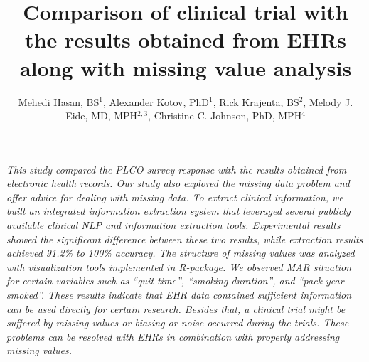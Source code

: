 \documentclass{amia}
\begin{document}
\title{Comparison of clinical trial with the results obtained from EHRs along with missing value analysis}

\author{Mehedi Hasan, BS$^{1}$, Alexander Kotov, PhD$^{1}$, Rick Krajenta, BS$^{2}$, Melody J. Eide, MD, MPH$^{2,3}$, Christine C. Johnson, PhD, MPH$^{4}$}


\maketitle

\textit{This study compared the PLCO survey response with the results obtained from electronic health records. Our study also explored the missing data problem and offer advice for dealing with missing data. To extract clinical information, we built an integrated information extraction system that leveraged several publicly available clinical NLP and information extraction tools. Experimental results showed the significant difference between these two results, while extraction results achieved 91.2\% to 100\% accuracy. The structure of missing values was analyzed with visualization tools implemented in R-package. We observed MAR situation for certain variables such as ``quit time'', ``smoking duration'', and ``pack-year smoked''. These results indicate that EHR data contained sufficient information can be used directly for certain research. Besides that, a clinical trial might be suffered by missing values or biasing or noise occurred during the trials. These problems can be resolved with EHRs in combination with properly addressing missing values.}
\end{document}
